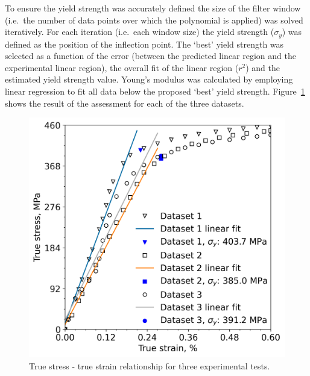 \documentclass[preprint, review, 12pt]{elsarticle}
\begin{document}
{	To ensure the yield strength was accurately defined the size of the filter window (i.e.\ the number of data points over which the polynomial is applied) was solved iteratively.
	For each iteration (i.e.\ each window size) the yield strength ($\sigma_y$) was defined as the position of the inflection point.
	The `best' yield strength was selected as a function of the error (between the predicted linear region and the experimental linear region), the overall fit of the linear region ($r^2$) and the estimated yield strength value.
	Young's modulus was calculated by employing linear regression to fit all data below the proposed `best' yield strength.
	Figure~\ref{fig:linear_region} shows the result of the assessment for each of the three datasets.

	\begin{figure}[!htbp]
		\centering
		\includegraphics[width=\linewidth, height=0.4\textheight, keepaspectratio]{SECOND_DERIV}
		\caption{True stress - true strain relationship for three experimental tests.}
		\label{fig:linear_region}
	\end{figure}

}
\end{document}
